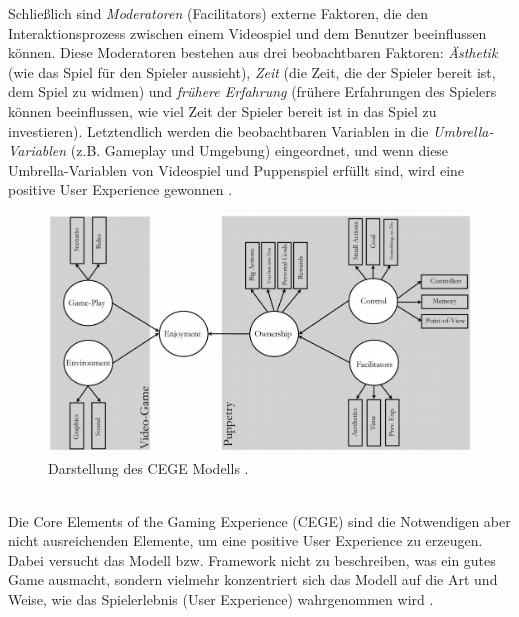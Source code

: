 \documentclass[a4paper,12pt]{scrartcl}
\begin{document}
Schließlich sind \textit{Moderatoren} (Facilitators) externe Faktoren, die den Interaktionsprozess zwischen einem Videospiel und dem Benutzer beeinflussen können. Diese Moderatoren bestehen aus drei beobachtbaren Faktoren: \textit{Ästhetik} (wie das Spiel für den Spieler aussieht), \textit{Zeit} (die Zeit, die der Spieler bereit ist, dem Spiel zu widmen) und \textit{frühere Erfahrung} (frühere Erfahrungen des Spielers können beeinflussen, wie viel Zeit der Spieler bereit ist in das Spiel zu investieren). Letztendlich werden die beobachtbaren Variablen in die \textit{Umbrella-Variablen} (z.B. Gameplay und Umgebung) eingeordnet, und wenn diese Umbrella-Variablen von Videospiel und Puppenspiel erfüllt sind, wird eine positive User Experience gewonnen \cite{CEGE2016}.
\\
\begin{figure}[h!]
\begin{center}
\includegraphics[scale = 0.6]{Bilder/CEGEModell.eps}
\caption{Darstellung des CEGE Modells \cite{Cege2009}.}
\label{CegeModelBild}
\end{center}
\end{figure}
\\
Die Core Elements of the Gaming Experience (CEGE) sind die Notwendigen aber nicht ausreichenden Elemente, um eine positive User Experience zu erzeugen. Dabei versucht das Modell bzw. Framework nicht zu beschreiben, was ein gutes Game ausmacht, sondern vielmehr konzentriert sich das Modell auf die Art und Weise, wie das Spielerlebnis (User Experience) wahrgenommen wird \cite{Cege2009}. 
\end{document}
